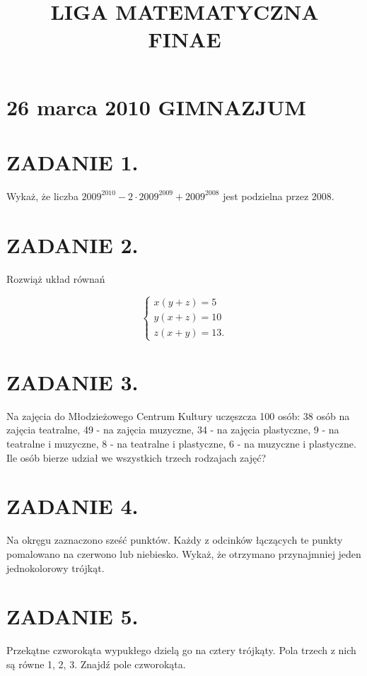 \documentclass[10pt]{article}
\title{LIGA MATEMATYCZNA \\
 FINAE }
\author{}
\date{}
\begin{document}
\maketitle
\section*{26 marca 2010 GIMNAZJUM}
\section*{ZADANIE 1.}
Wykaż, że liczba \(2009^{2010}-2 \cdot 2009^{2009}+2009^{2008}\) jest podzielna przez 2008.

\section*{ZADANIE 2.}
Rozwiąż układ równań

\[
\left\{\begin{array}{l}
x(y+z)=5 \\
y(x+z)=10 \\
z(x+y)=13 .
\end{array}\right.
\]

\section*{ZADANIE 3.}
Na zajęcia do Młodzieżowego Centrum Kultury uczęszcza 100 osób: 38 osób na zajęcia teatralne, 49 - na zajęcia muzyczne, 34 - na zajęcia plastyczne, 9 - na teatralne i muzyczne, 8 - na teatralne i plastyczne, 6 - na muzyczne i plastyczne. Ile osób bierze udział we wszystkich trzech rodzajach zajęć?

\section*{ZADANIE 4.}
Na okręgu zaznaczono sześć punktów. Każdy z odcinków łączących te punkty pomalowano na czerwono lub niebiesko. Wykaż, że otrzymano przynajmniej jeden jednokolorowy trójkąt.

\section*{ZADANIE 5.}
Przekątne czworokąta wypukłego dzielą go na cztery trójkąty. Pola trzech z nich są równe 1, 2, 3. Znajdź pole czworokąta.
\end{document}
